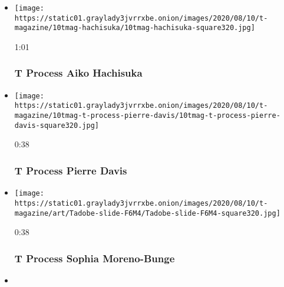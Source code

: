 \begin{itemize}
\item
  \href{https://www.nytimes3xbfgragh.onion/video/t-magazine/100000007260935/t-process-aiko-hachisuka.html?action=click\&module=video-series-bar\&region=header\&pgtype=Article\&playlistId=video/t-process}{}

  \texttt{[image: https://static01.graylady3jvrrxbe.onion/images/2020/08/10/t-magazine/10tmag-hachisuka/10tmag-hachisuka-square320.jpg]}

  1:01

  \hypertarget{t-process--aiko-hachisuka}{%
  \subsubsection{T Process \textbar{} Aiko
  Hachisuka}\label{t-process--aiko-hachisuka}}
\item
  \href{https://www.nytimes3xbfgragh.onion/video/t-magazine/100000007259335/t-process-pierre-davis.html?action=click\&module=video-series-bar\&region=header\&pgtype=Article\&playlistId=video/t-process}{}

  \texttt{[image: https://static01.graylady3jvrrxbe.onion/images/2020/08/10/t-magazine/10tmag-t-process-pierre-davis/10tmag-t-process-pierre-davis-square320.jpg]}

  0:38

  \hypertarget{t-process--pierre-davis}{%
  \subsubsection{T Process \textbar{} Pierre
  Davis}\label{t-process--pierre-davis}}
\item
  \href{https://www.nytimes3xbfgragh.onion/video/t-magazine/design/100000007258999/t-process-sophia-moreno-bunge.html?action=click\&module=video-series-bar\&region=header\&pgtype=Article\&playlistId=video/t-process}{}

  \texttt{[image: https://static01.graylady3jvrrxbe.onion/images/2020/08/10/t-magazine/art/Tadobe-slide-F6M4/Tadobe-slide-F6M4-square320.jpg]}

  0:38

  \hypertarget{t-process--sophia-moreno-bunge}{%
  \subsubsection{T Process \textbar{} Sophia
  Moreno-Bunge}\label{t-process--sophia-moreno-bunge}}
\item
  \href{https://www.nytimes3xbfgragh.onion/video/t-magazine/100000007129787/t-process-prada-galleria-bag.html?action=click\&module=video-series-bar\&region=header\&pgtype=Article\&playlistId=video/t-process}{}


\end{itemize}
